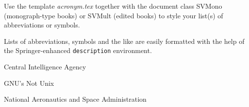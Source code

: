 %
%


Use the template \emph{acronym.tex} together with the document class SVMono (monograph-type books) or SVMult (edited books) to style your list(s) of abbreviations or symbols.

Lists of abbreviations, symbols and the like are easily formatted with the help of the Springer-enhanced \verb|description| environment.

\begin{description}[list]
\item[CIA]{Central Intelligence Agency}
\item[GNU]{GNU's Not Unix}
\item[NASA]{National Aeronautics and Space Administration}


\end{description}